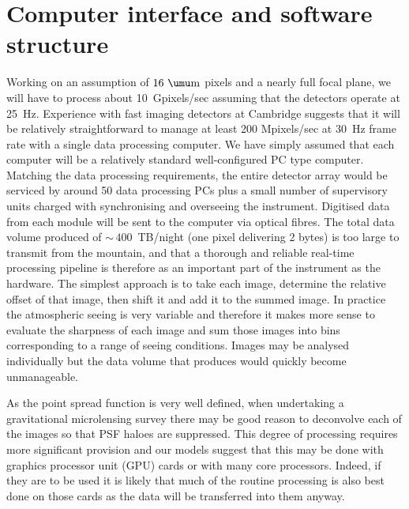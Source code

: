 \documentclass{pasa}%
\begin{document}
\section{Computer interface and software structure}

Working on an assumption of $16~\umu\mbox{m}$ pixels and a nearly full focal plane, we will have to process about 10~Gpixels/sec assuming that the detectors operate at 25~Hz.  Experience with fast imaging detectors at Cambridge suggests that it will be relatively straightforward to manage at least 200 Mpixels/sec at 30~Hz frame rate with a single data processing computer.  We have simply assumed that each computer will be a relatively standard well-configured PC type computer.  Matching the data processing requirements, the entire detector array would be serviced by around 50 data processing PCs plus a small number of supervisory units charged with synchronising and overseeing the instrument. Digitised data from each module will be sent to the computer via optical fibres. The total data volume produced of $\sim\,400$~TB/night (one pixel delivering 2 bytes) is too large to transmit from the mountain, and that a thorough and reliable real-time processing pipeline is therefore as an important part of the instrument as the hardware.
  The simplest approach is to take each image, determine the relative offset of that image, then shift it and add it to the summed image.  In practice the atmospheric seeing is very variable and therefore it makes more sense to evaluate the sharpness of each image and sum those images into bins corresponding to a range of seeing conditions.  Images may be analysed individually but the data volume that produces would quickly become unmanageable.

As the point spread function is very well defined, when undertaking a gravitational microlensing survey there may be good reason to deconvolve each of the images so that PSF haloes are suppressed.  This degree of processing requires more significant provision and our models suggest that this may be done with graphics processor unit (GPU) cards or with many core
processors. Indeed, if they are to be used it is likely that much of the routine processing is also best done on those cards as the data will be transferred into them anyway.  
\end{document}

